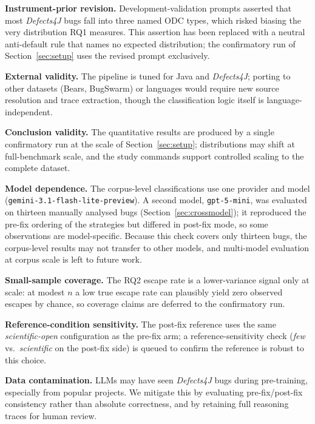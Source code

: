 \smallskip
\noindent\textbf{Instrument-prior revision.}\quad
Development-validation prompts asserted that most \textit{Defects4J} bugs fall
into three named ODC types, which risked biasing the very distribution RQ1
measures. This assertion has been replaced with a neutral anti-default rule
that names no expected distribution; the confirmatory run of
Section~\ref{sec:setup} uses the revised prompt exclusively.

\smallskip
\noindent\textbf{External validity.}\quad
The pipeline is tuned for Java and \textit{Defects4J}; porting to other datasets
(Bears, BugSwarm) or languages would require new source resolution and trace
extraction, though the classification logic itself is language-independent.

\smallskip
\noindent\textbf{Conclusion validity.}\quad
The quantitative results are produced by a single confirmatory run at the scale of
Section~\ref{sec:setup}; distributions may shift at full-benchmark scale, and the
study commands support controlled scaling to the complete dataset.

\smallskip
\noindent\textbf{Model dependence.}\quad
The corpus-level classifications use one provider and model
(\texttt{gemini-3.1-flash-lite-preview}). A second model, \texttt{gpt-5-mini},
was evaluated on thirteen manually analysed bugs (Section~\ref{sec:crossmodel});
it reproduced the pre-fix ordering of the strategies but differed in post-fix
mode, so some observations are model-specific. Because this check covers only
thirteen bugs, the corpus-level results may not transfer to other models, and
multi-model evaluation at corpus scale is left to future work.

\smallskip
\noindent\textbf{Small-sample coverage.}\quad
The RQ2 escape rate is a lower-variance signal only at scale: at modest $n$ a low
true escape rate can plausibly yield zero observed escapes by chance, so coverage
claims are deferred to the confirmatory run.

\smallskip
\noindent\textbf{Reference-condition sensitivity.}\quad
The post-fix reference uses the same \textit{scientific-open} configuration as the
pre-fix arm; a reference-sensitivity check (\textit{few} vs.\ \textit{scientific}
on the post-fix side) is queued to confirm the reference is robust to this choice.

\smallskip
\noindent\textbf{Data contamination.}\quad
LLMs may have seen \textit{Defects4J} bugs during pre-training, especially from
popular projects. We mitigate this by evaluating pre-fix/post-fix consistency
rather than absolute correctness, and by retaining full reasoning traces for
human review.

